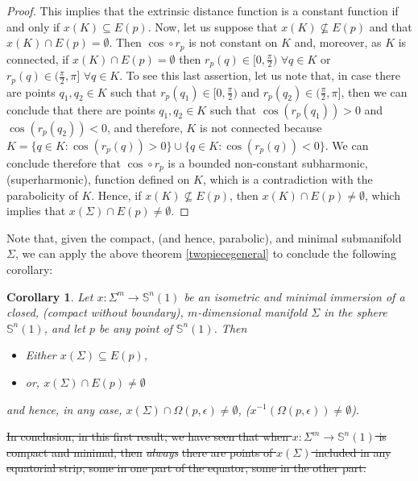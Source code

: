 \documentclass{amsart}
\newtheorem{corollary}[theorem]{Corollary}
\theoremstyle{definition}
\theoremstyle{remark}
\providecommand{\DIFadd}[1]{{\protect\color{blue}\uwave{#1}}} %
\providecommand{\DIFdel}[1]{{\protect\color{red}\sout{#1}}}                      %
\providecommand{\DIFaddbegin}{} %
\providecommand{\DIFaddend}{} %
\providecommand{\DIFdelbegin}{} %
\providecommand{\DIFdelend}{} %
\begin{document}
\begin{proof}
This implies that the extrinsic distance function is a constant function \DIFaddbegin \DIFadd{in $K$ }\DIFaddend if and only if $x(K)\subseteq E(p)$.
Now,  let us suppose that $x(K) \not\subseteq E(p)$ and that $x(K)\cap  E(p)=\emptyset$. Then $\cos\circ r_p$ is not constant on $K$ and, moreover, as $K$ is connected,  if $x(K)\cap  E(p)=\emptyset$ then $r_p(q) \in [0,\frac{\pi}{2})\,\,\forall q \in K$ or $r_p(q) \in (\frac{\pi}{2},\pi]\,\,\forall q \in K$. To see this last assertion, let us note that, in case there are points $q_1, q_2 \in K$ such that $r_p(q_1) \in [0,\frac{\pi}{2})$ and  $r_p(q_2) \in (\frac{\pi}{2},\pi]$, then we can conclude that there are points $q_1, q_2 \in K$ such that $\cos(r_p(q_1)) >0$ and  $\cos (r_p(q_2)) <0$, and therefore, $K$ is not connected because $K=\{ q \in K: \cos(r_p(q)) >0\}\cup \{ q \in K: \cos(r_p(q))< 0\} $. We can conclude therefore that $\cos\circ r_p$ is a bounded non-constant subharmonic, (superharmonic), function defined on $K$, which is a contradiction with the parabolicity of $K$. Hence, if  $x(K) \not\subseteq E(p)$, then $x(K)\cap  E(p)\neq \emptyset$, which implies that $x(\Sigma)\cap  E(p)\neq \emptyset$.\end{proof}
Note that, given the compact, (and hence, parabolic), and minimal submanifold $\Sigma$, we can apply  the above theorem \ref{twopiecegeneral} to conclude the following corollary:
\begin{corollary}\DIFaddbegin \label{cortwo}
	\DIFaddend Let  $x: \Sigma^m \to \mathbb{S}^n(1)$ be an isometric and minimal immersion of a closed, (compact without boundary), $m$-dimensional manifold $\Sigma$ in the sphere  $\mathbb{S}^n(1)$, and let $p$ be any point of $\mathbb{S}^n(1)$.  Then
    \begin{itemize}
        \item Either $x(\Sigma)\subseteq E(p)$, 
        \item or, $x(\Sigma)\cap E(p)\neq \emptyset$
            \end{itemize}
            and  hence, in any case,  $x(\Sigma) \cap \Omega(p,\epsilon) \neq \emptyset$, ($x^{-1}(\Omega(p,\epsilon))\neq \emptyset$).
\end{corollary}
\DIFdelbegin \DIFdel{In conclusion, in this first result, we have seen that when $x: \Sigma^m \to \mathbb{S}^n(1)$ is  compact and minimal, then }\emph{\DIFdel{always}} %
\DIFdel{there are points of $x(\Sigma)$ included in any equatorial strip, some in one part of the equator, some in the other part.
}\DIFdelend %
\end{document}
